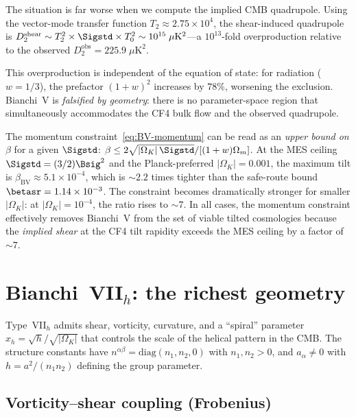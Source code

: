The situation is far worse when we compute the implied CMB
quadrupole.  Using the vector-mode transfer function
$T_2 \approx 2.75 \times 10^4$, the shear-induced quadrupole is
$D_2^{\mathrm{shear}} \sim T_2^2 \times \Sigstd \times T_0^2
\sim 10^{15}\;\mu\mathrm{K}^2$---a $10^{13}$-fold
overproduction relative to the observed
$D_2^{\mathrm{obs}} = 225.9\;\mu\mathrm{K}^2$.

This overproduction is independent of the equation of state:
for radiation ($w = 1/3$), the prefactor $(1+w)^2$ increases by
$78\%$, worsening the exclusion.  Bianchi~V is
\emph{falsified by geometry}: there is no parameter-space region
that simultaneously accommodates the CF4 bulk flow and the
observed quadrupole.

\begin{remark}
\label{rem:BV-tilt-bound}
The momentum constraint~\eqref{eq:BV-momentum} can be read as
an \emph{upper bound on $\beta$} for a given $\Sigstd$:
$\beta \leq 2\sqrt{|\Omega_K|\,\Sigstd}/[(1+w)\Omega_m]$.
At the MES ceiling $\Sigstd = (3/2)\Bsig^2$ and the Planck-preferred
$|\Omega_K| = 0.001$, the maximum tilt is
$\beta_{\mathrm{BV}} \approx 5.1 \times 10^{-4}$,
which is $\sim 2.2$ times tighter than the safe-route bound
$\betasr = 1.14 \times 10^{-3}$.  The constraint becomes
dramatically stronger for smaller $|\Omega_K|$: at
$|\Omega_K| = 10^{-4}$, the ratio rises to $\sim 7$.  In all
cases, the momentum constraint effectively removes Bianchi~V
from the set of viable tilted cosmologies because the
\emph{implied shear} at the CF4 tilt rapidity exceeds the MES
ceiling by a factor of $\sim 7$.
\end{remark}


\section{Bianchi~VII$_h$: the richest geometry}
\label{sec:BVIIh}

Type~VII$_h$ admits shear, vorticity, curvature, and a
``spiral'' parameter $x_h = \sqrt{h}/\sqrt{|\Omega_K|}$
that controls the scale of the helical pattern in the CMB.
The structure constants have $n^{\alpha\beta} =
\mathrm{diag}(n_1, n_2, 0)$ with $n_1, n_2 > 0$, and
$a_\alpha \neq 0$ with $h = a^2/(n_1 n_2)$ defining the
group parameter.


\subsection{Vorticity--shear coupling (Frobenius)}
\label{sec:VIIh-frobenius}

